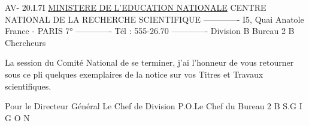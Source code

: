 AV- 20.I.7I
\uline{MINISTERE DE L'EDUCATION NATIONALE}
CENTRE NATIONAL DE LA RECHERCHE
SCIENTIFIQUE
-------------
I5, Quai Anatole France - PARIS 7° 
-------------
Tél : 555-26.70 
-------------
Division B 
Bureau 2 B
Chercheurs 

La session du Comité National  de
se terminer, j'ai l'honneur de vous retourner
sous ce pli quelques exemplaires de la notice
sur vos Titres et Travaux scientifiques.

Pour le Directeur Général
Le Chef de Division
P.O.Le Chef du Bureau 2 B
S.G I G O N

